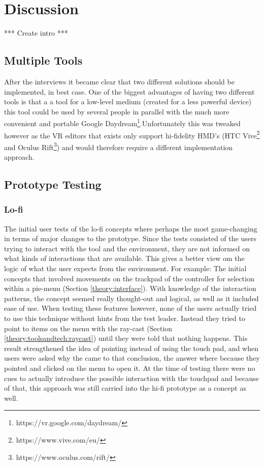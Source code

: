 
\chapter{Discussion}
*** Create intro ***
\section{Multiple Tools}
After the interviews it became clear that two different solutions should be implemented, in best case. One of the biggest advantages of having two different tools is that a a tool for a low-level medium (created for a less powerful device) this tool could be used by several people in parallel with the much more convenient and portable Google Daydream\footnote{https://vr.google.com/daydream/}.Unfortunately this was tweaked however as the VR editors that exists only support hi-fidelity HMD's (HTC Vive\footnote{https://www.vive.com/eu/} and Oculus Rift\footnote{https://www.oculus.com/rift/}) and would therefore require a different implementation approach.
\section{Prototype Testing}
\subsection{Lo-fi}
The initial user tests of the lo-fi concepts where perhaps the most game-changing in terms of major changes to the prototype. Since the tests consisted of the users trying to interact with the tool and the environment, they are not informed on what kinds of interactions that are available. This gives a better view om the logic of what the user expects from the environment. For example: The initial concepts that involved movements on the trackpad of the controller for selection within a pie-menu (Section \ref{theory:interface}). With knowledge of the interaction patterns, the concept seemed really thought-out and logical, as well as it included ease of use. When testing these features however, none of the users actually tried to use this technique without hints from the test leader. Instead they tried to point to items on the menu with the ray-cast (Section \ref{theory:toolsandtech:raycast}) until they were told that nothing happens. This result strengthened the idea of pointing instead of using the touch pad, and when users were asked why the came to that conclusion, the answer where because they pointed and clicked on the menu to open it. At the time of testing there were no cues to actually introduce the possible interaction with the touchpad and because of that, this approach was still carried into the hi-fi prototype as a concept as well.

